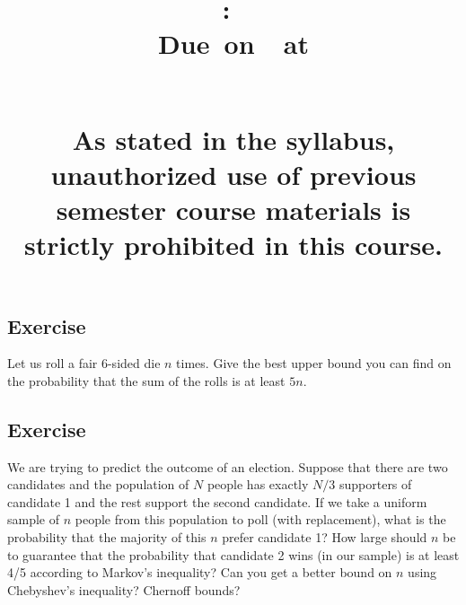 \documentclass{article}
\title{
    \vspace{2in}
    \textbf{\hmwkClass:\ \hmwkTitle}\\
    \normalsize\vspace{0.1in}\small{Due\ on\ \hmwkDueDate\ at \hmwkDueTime}\\
    \vspace{0.1in}\large{\textit{\hmwkClassInstructor\ \hmwkSection}} \\
    \vspace{0.8in}
    \begin{minipage}[t]{0.4\columnwidth}
        {\footnotesize\textbf{As stated in the syllabus, unauthorized use of previous semester course materials is strictly prohibited in this course.
        }}
    \vspace{0.5in}
    \end{minipage}
    \vspace{0.8in}
    \author{\textbf{\hmwkAuthorName}}
    \date{}
}
\newcounter{counter}
\newcommand{\Exercise}{Exercise \stepcounter{counter}\thecounter}
\begin{document}
\maketitle
\pagebreak






\subsection*{\Exercise}
  Let us roll a fair 6-sided die $n$ times. Give the best upper bound you can find on the probability that the sum of the rolls is at least $5n$.

\subsection*{\Exercise}
    We are trying to predict the outcome of an election. Suppose that there are two candidates and the population of $N$ people has exactly $N/3$ supporters of candidate 1 and the rest support the second candidate. If we take a uniform sample of $n$ people from this population to poll (with replacement), what is the probability that the majority of this $n$ prefer candidate 1? How large should $n$ be to guarantee that the probability that candidate 2 wins (in our sample) is at least 4/5 according to Markov's inequality? Can you get a better bound on $n$ using Chebyshev's inequality? Chernoff bounds?
\end{document}
